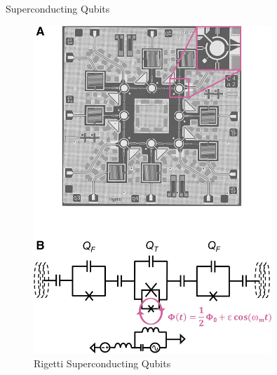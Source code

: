 \documentclass{beamer}
\begin{document}
\begin{frame}{Superconducting Qubits}
    \begin{figure}
        \centering
    \includegraphics[width=0.8\textwidth]{images/rigetti.jpeg}
        \caption{Rigetti Superconducting Qubits}
    \end{figure}
\end{frame}
\end{document}
